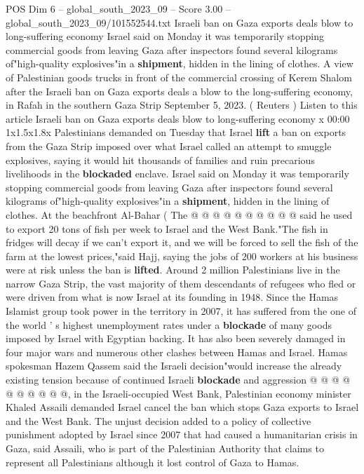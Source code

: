 \begin{textsample}{POS Dim 6 – global\_south\_2023\_09 – Score 3.00 – global\_south\_2023\_09/101552544.txt}  \label{ex:f6_pos_381}
Israeli ban on Gaza exports deals blow to long-suffering economy Israel said on Monday it was temporarily stopping commercial goods from leaving Gaza after inspectors found several kilograms of"high-quality explosives"in a \textbf{shipment}, hidden in the lining of clothes.
A view of Palestinian goods trucks in front of the commercial crossing of Kerem Shalom after the Israeli ban on Gaza exports deals a blow to the long-suffering economy, in Rafah in the southern Gaza Strip September 5, 2023. ( Reuters ) Listen to this article Israeli ban on Gaza exports deals blow to long-suffering economy x 00:00 1x1.5x1.8x Palestinians demanded on Tuesday that Israel \textbf{lift} a ban on exports from the Gaza Strip imposed over what Israel called an attempt to smuggle explosives, saying it would hit thousands of families and ruin precarious livelihoods in the \textbf{blockaded} enclave.
Israel said on Monday it was temporarily stopping commercial goods from leaving Gaza after inspectors found several kilograms of"high-quality explosives"in a \textbf{shipment}, hidden in the lining of clothes.
At the beachfront Al-Bahar ( The @ @ @ @ @ @ @ @ @ @ said he used to export 20 tons of fish per week to Israel and the West Bank."The fish in fridges will decay if we can't export it, and we will be forced to sell the fish of the farm at the lowest prices,"said Hajj, saying the jobs of 200 workers at his business were at risk unless the ban is \textbf{lifted}.
Around 2 million Palestinians live in the narrow Gaza Strip, the vast majority of them descendants of refugees who fled or were driven from what is now Israel at its founding in 1948.
Since the Hamas Islamist group took power in the territory in 2007, it has suffered from the one of the world ' s highest unemployment rates under a \textbf{blockade} of many goods imposed by Israel with Egyptian backing.
It has also been severely damaged in four major wars and numerous other clashes between Hamas and Israel.
Hamas spokesman Hazem Qassem said the Israeli decision"would increase the already existing tension because of continued Israeli \textbf{blockade} and aggression @ @ @ @ @ @ @ @ @ @, in the Israeli-occupied West Bank, Palestinian economy minister Khaled Assaili demanded Israel cancel the ban which stops Gaza exports to Israel and the West Bank.
The unjust decision added to a policy of collective punishment adopted by Israel since 2007 that had caused a humanitarian crisis in Gaza, said Assaili, who is part of the Palestinian Authority that claims to represent all Palestinians although it lost control of Gaza to Hamas.

\end{textsample}
